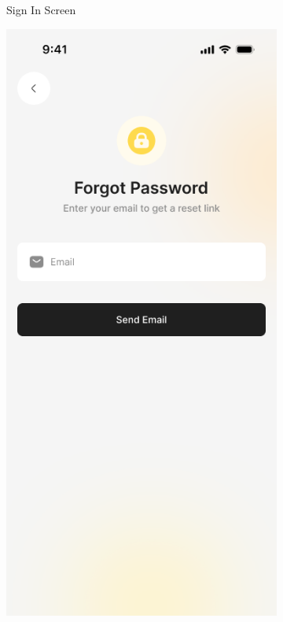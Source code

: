 \begin{figure}[H]
\begin{subfigure}[b]{0.32\textwidth}
        \caption{Sign In Screen}
        \label{fig:signin_screen}
    \end{subfigure}
    \hfill
    \begin{subfigure}[b]{0.32\textwidth}
        \centering
        \includegraphics[width=\textwidth]{images/forgot_password_screen.png}

\end{subfigure}
\end{figure}
